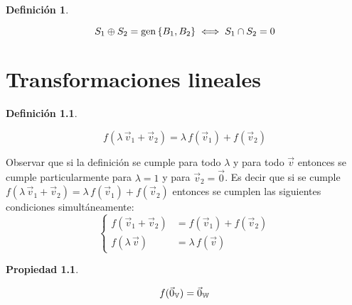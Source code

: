 \documentclass[a5paper,12pt,twoside]{book}
\newtheorem{defn}{{Definición}}[chapter]
\newtheorem{prop}{{Propiedad}}[chapter]
\begin{document}
\begin{mdframed}[style=DefinitionFrame]
    \begin{defn}
    \end{defn}
    \begin{equation*}
        S_1 \oplus S_2 = \operatorname{gen} { \left\{ {B_1 , B_2} \right\} } \iff S_1 \cap S_2 = 0
    \end{equation*}
\end{mdframed}


\chapter{Transformaciones lineales}
\label{cha:TL}

\begin{mdframed}[style=DefinitionFrame]
    \begin{defn}
        \label{defn:TL}
    \end{defn}
    \begin{equation*}
        f(\lambda \, \Vec{v}_1 + \Vec{v}_2) = \lambda \, f(\Vec{v}_1) + f(\Vec{v}_2)
    \end{equation*}
\end{mdframed}

Observar que si la definición se cumple para todo $\lambda$ y para todo $\Vec{v}$ entonces se cumple particularmente para $\lambda=1$ y para $\Vec{v}_2=\Vec{0}$.
Es decir que si se cumple $f(\lambda \, \Vec{v}_1 + \Vec{v}_2)=\lambda \, f(\Vec{v}_1) + f(\Vec{v}_2)$ entonces se cumplen las siguientes condiciones simultáneamente:
\begin{equation*}
    \left\{
    \begin{aligned}
        f(\Vec{v}_1 + \Vec{v}_2) &= f(\Vec{v}_1) + f(\Vec{v}_2)
        \\
        f(\lambda \, \Vec{v}) &= \lambda \, f(\Vec{v})
    \end{aligned}
    \right.
\end{equation*}

\begin{mdframed}[style=PropertyFrame]
    \begin{prop}
    \end{prop}
    \begin{equation*}
        f(\Vec{0}_{\mathbb{V}}) = \Vec{0}_{\mathbb{W}}
    \end{equation*}
\end{mdframed}
\end{document}
